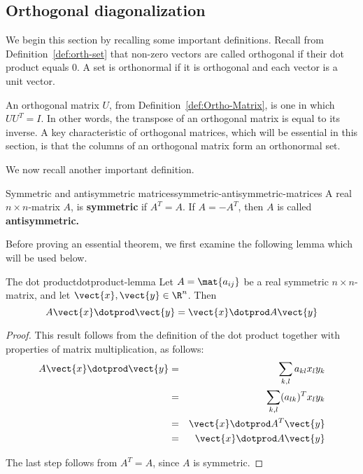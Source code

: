 \subsection{Orthogonal diagonalization}

We begin this section by recalling some important definitions. Recall from Definition~\ref{def:orth-set} that non-zero vectors are called orthogonal if their dot product equals $0$.  A set is orthonormal if it is orthogonal and each vector is a unit vector. 

An orthogonal matrix $U$, from Definition~\ref{def:Ortho-Matrix}, is one in which $UU^{T} = I$. In other words, the transpose of an orthogonal matrix is equal to its inverse. A key characteristic of orthogonal matrices, which will be essential in this section, is that the columns of an orthogonal matrix form an orthonormal set. 

We now recall another important definition. 

\begin{definition}{Symmetric and antisymmetric matrices}{symmetric-antisymmetric-matrices}
A real $n\times n$-matrix $A$, is \textbf{symmetric }if $A^{T}=A$. If $%
A=-A^{T}$, then $A$ is called \textbf{antisymmetric. }
\end{definition}

Before proving an essential theorem, we first examine the following lemma which will be used below.

\begin{lemma}{The dot product}{dotproduct-lemma}
Let $A=\mat{a_{ij} }$ be a real symmetric $n \times n$-matrix, and let $\vect{x}, \vect{y} \in \R^n$. Then
\[
A\vect{x} \dotprod \vect{y} = \vect{x} \dotprod A \vect{y}
\]
\end{lemma}

\begin{proof}
This result follows from the definition of the dot product together with properties of matrix multiplication, as follows:
\begin{eqnarray*}
A\vect{x} \dotprod \vect{y} &=& \sum_{k,l}a_{kl}x_{l}y_{k} \\
&=&\sum_{k,l} (a_{lk})^Tx_{l}y_{k} \\
&=& \vect{x}\dotprod A^{T}\vect{y} \\
&=& \vect{x}\dotprod A \vect{y}
\end{eqnarray*}

The last step follows from $A^T = A$, since $A$ is symmetric. 
\end{proof}

